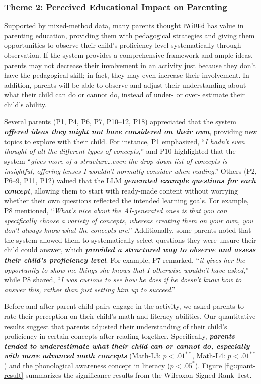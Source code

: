 \subsubsection{Theme 2: Perceived Educational Impact on Parenting} \label{sec-6.4.2}

Supported by mixed-method data, many parents thought \texttt{PAiREd} has value in parenting education, providing them with pedagogical strategies and giving them opportunities to observe their child's proficiency level systematically through observation. If the system provides a comprehensive framework and ample ideas, parents may not decrease their involvement in an activity just because they don't have the pedagogical skill; in fact, they may even increase their involvement. In addition, parents will be able to observe and adjust their understanding about what their child can do or cannot do, instead of under- or over- estimate their child's ability.

Several parents (P1, P4, P6, P7, P10--12, P18) appreciated that the system \textit{\textbf{offered ideas they might not have considered on their own}}, providing new topics to explore with their child. For instance, P1 emphasized, ``\textit{I hadn't even thought of all the different types of concepts},'' and P10 highlighted that the system ``\textit{gives more of a structure…even the drop down list of concepts is insightful, offering lenses I wouldn't normally consider when reading}.'' Others (P2, P6--9, P11, P12) valued that the LLM \textit{\textbf{generated example questions for each concept}}, allowing them to start with ready-made content without worrying whether their own questions reflected the intended learning goals. For example, P8 mentioned, ``\textit{What's nice about the AI-generated ones is that you can specifically choose a variety of concepts, whereas creating them on your own, you don't always know what the concepts are}.'' Additionally, some parents noted that the system allowed them to systematically select questions they were unsure their child could answer, which \textit{\textbf{provided a structured way to observe and assess their child's proficiency level}}. For example, P7 remarked, ``\textit{it gives her the opportunity to show me things she knows that I otherwise wouldn't have asked},'' while P8 shared, ``\textit{I was curious to see how he does if he doesn't know how to answer this, rather than just setting him up to succeed}.''

Before and after parent-child pairs engage in the activity, we asked parents to rate their perception on their child's math and literacy abilities. Our quantitative results suggest that parents adjusted their understanding of their child's proficiency in certain concepts after reading together. Specifically, \textit{\textbf{parents tended to underestimate what their child can or cannot do, especially with more advanced math concepts}} (Math-L3: $p < .01^{**}$, Math-L4: $p < .01^{**}$) and the phonological awareness concept in literacy ($p < .05^{*}$). Figure \ref{fig:quant-result} summarizes the significance results from the Wilcoxon Signed-Rank Test.

